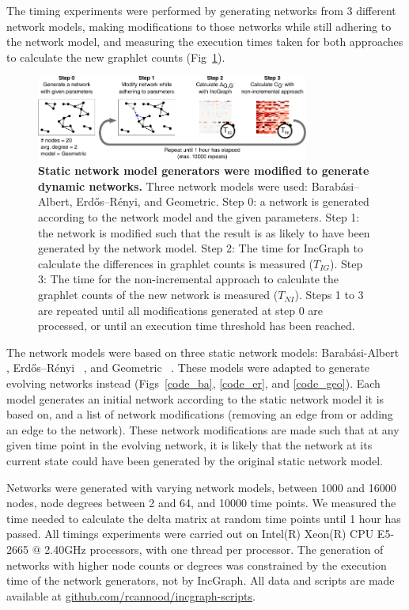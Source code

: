 The timing experiments were performed by generating networks from 3 different network models, making modifications to those networks while still adhering to the network model, and measuring the execution times taken for both approaches to calculate the new graphlet counts (Fig~\ref{fig_method_speedup}). 

\begin{figure}[ht!]
	\centering
	\includegraphics[width=0.8\textwidth]{fig/figure3.pdf}
	\caption{{\bf Static network model generators were modified to generate dynamic networks.}
		Three network models were used: Barabási–Albert, Erdős–Rényi, and Geometric. Step 0: a network is generated according to the network model and the given parameters. Step 1: the network is modified such that the result is as likely to have been generated by the network model. Step 2: The time for IncGraph to calculate the differences in graphlet counts is measured ($T_{IG}$). Step 3: The time for the non-incremental approach to calculate the graphlet counts of the new network is measured ($T_{NI}$). Steps 1 to 3 are repeated until all modifications generated at step 0 are processed, or until an execution time threshold has been reached.}
	\label{fig_method_speedup}
\end{figure}

The network models were based on three static network models: Barab\'asi-Albert~ \cite{albert_statisticalmechanicscomplex_2002}, Erd\H{o}s--R\'enyi~ \cite{erdos_randomgraphs_1959}, and Geometric~ \cite{appel_minimumvertexdegree_1997}. These models were adapted to generate evolving networks instead (Figs~\ref{code_ba}, \ref{code_er}, and \ref{code_geo}).
Each model generates an initial network according to the static network model it is based on, and a list of network modifications (removing an edge from or adding an edge to the network). These network modifications are made such that at any given time point in the evolving network, it is likely that the network at its current state could have been generated by the original static network model.

Networks were generated with varying network models, between 1000 and 16000 nodes, node degrees between 2 and 64, and 10000 time points. We measured the time needed to calculate the delta matrix at random time points until 1 hour has passed. All timings experiments were carried out on Intel(R) Xeon(R) CPU E5-2665 $@$ 2.40GHz processors, with one thread per processor.
The generation of networks with higher node counts or degrees was constrained by the execution time of the network generators, not by IncGraph. All data and scripts are made available at \href{https://github.com/rcannood/incgraph-scripts}{github.com/rcannood/incgraph-scripts}.


